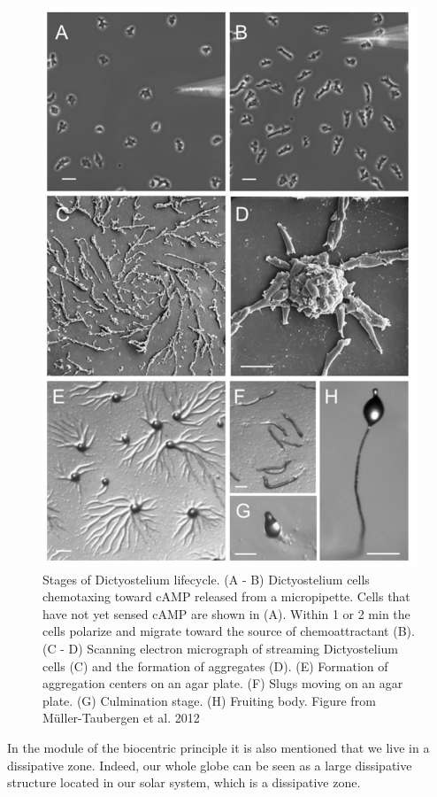 \documentclass[
  11pt,
]{book}
\begin{document}
\begin{figure}

{\centering \includegraphics[width=0.6\linewidth]{./figs/Dictyostelida} 

}

\caption{Stages of Dictyostelium lifecycle. (A - B) Dictyostelium cells chemotaxing toward cAMP released from a micropipette. Cells that have not yet sensed cAMP are shown in (A). Within 1 or 2 min the cells polarize and migrate toward the source of chemoattractant (B). (C - D) Scanning electron micrograph of streaming Dictyostelium cells (C) and the formation of aggregates (D). (E) Formation of aggregation centers on an agar plate. (F) Slugs moving on an agar plate. (G) Culmination stage. (H) Fruiting body. Figure from Müller-Taubergen et al. 2012}\label{fig:Dictyostelium}
\end{figure}

\newpage

In the module of the biocentric principle it is also mentioned that we live in a dissipative zone. Indeed, our whole globe can be seen as a large dissipative structure located in our solar system, which is a dissipative zone.
\end{document}
